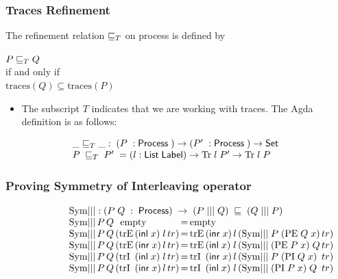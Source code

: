 \documentclass{beamer}
\newcommand{\ar}{\rightarrow}
\newcommand{\Set}{\mathsf{Set}}
\newcommand{\Process}{\mathsf{Process}}
\newcommand{\List}{\mathsf{List}}
\newcommand{\Label}{\mathsf{Label}}
\newcommand{\inl}{\mathsf{inl}}
\newcommand{\inr}{\mathsf{inr}}
\newcommand{\emptyC}{\mathrm{empty}}
\newcommand{\extChoice}{\mathrm{trE}}
\newcommand{\intChoice}{\mathrm{trI}}
\newcommand{\Sym}{\mathrm{Sym}}
\newcommand{\Tr}{\mathrm{Tr}}
\newcommand{\pii}{\mathrm{PI}}
\newcommand{\pe}{\mathrm{PE}}
\begin{document}
\begin{frame}
\frametitle{Traces Refinement}

The refinement relation $\refinedby_T$ on process is defined by 
\begin{center}
$P\refinedby_T Q$\\
if and only if \\
$\mathrm{traces}(Q)\subseteq \mathrm{traces}(P)$
\end{center}
%
\begin{itemize}

\item The subscript $T$ indicates that we are working with traces.
The Agda definition is as follows:

\end{itemize}

\[\begin{array}[t]{@{}lcl} 
\_\refinedby_T\_ :\; (P\;: \Process \; ) \ar(P'\;: \Process \; )\ar \Set  \\
P \;\refinedby_T \;P' \; = (l : \List \; \Label) \ar \Tr \; l \; P' \ar \Tr \; l \; P\\



\end{array} \]



\end{frame}


\begin{frame}

\frametitle{ Proving Symmetry of Interleaving operator }


\[\begin{array}[t]{@{}l@{\,}l@{\,}l@{\,}l@{\,}l@{\,}l@{\,}l@{\,}c@{\,}l@{\,}l@{\,}l@{\,}l@{\,}l@{\,}l@{\,}l} 
\multicolumn{15}{@{}l}{\Sym|||  : (P\; Q\; :\; \Process) \; \ar\; (P \; ||| \; Q) \; \refinedby \; (Q \; ||| \; P) }  \\
  \Sym|||&P& Q &\multicolumn{4}{l}{\emptyC }&=&\multicolumn{4}{@{}l}{\emptyC} \\ 
  \Sym|||&P&Q&(\extChoice  &(\inl\; x)  &l  &tr)& =&\extChoice  &(\inr\; x)  &l   &(\Sym|||\; P\; (\pe\; Q\; x)&tr) \mbox{\qquad \qquad \qquad \qquad \qquad \qquad \qquad \qquad  }\\
 \Sym|||&P&Q& (\extChoice &(\inr\; x)  &l  &tr)&=&\extChoice  &(\inl\; x)  &l  &(\Sym|||\; (\pe\; P\; x)\; Q &tr)  \\
 \Sym|||&P&Q& (\intChoice  &(\inl\; x)  &l  &tr)& =& \intChoice & (\inr\; x)& l  &(\Sym|||\; P\; (\pii\; Q\; x) &tr)  \\
 \Sym|||&P&Q& (\intChoice\; &(\inr\; x)  &l  &tr)& =& \intChoice  &(\inl\; x)  &l  &(\Sym|||\; (\pii\; P\; x)\; Q &tr) \\
 
\end{array} \]

\end{frame}
\end{document}
